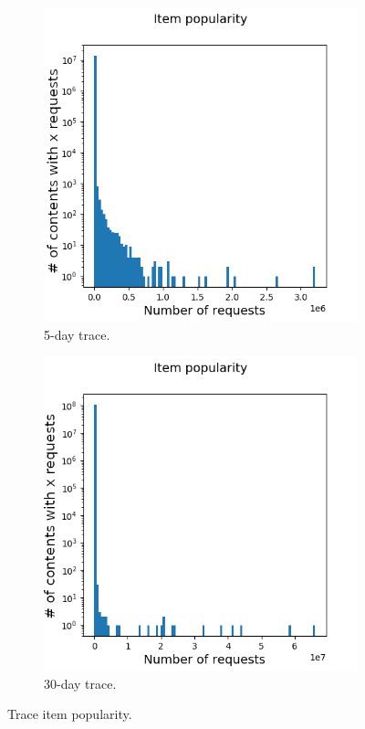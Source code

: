 \begin{figure}[b!]
	\centering
	
	\begin{subfigure}[b]{0.49\linewidth}
		\includegraphics[width=\linewidth]{pics/real_item_pop.png}
		\caption{5-day trace.}
	\end{subfigure}
	\begin{subfigure}[b]{0.49\linewidth}
		\includegraphics[width=\linewidth]{pics/real2_item_pop.png}
		\caption{30-day trace.}
	\end{subfigure}
	\caption{Trace item popularity.}
	\label{fig:pop_1}
\end{figure}

